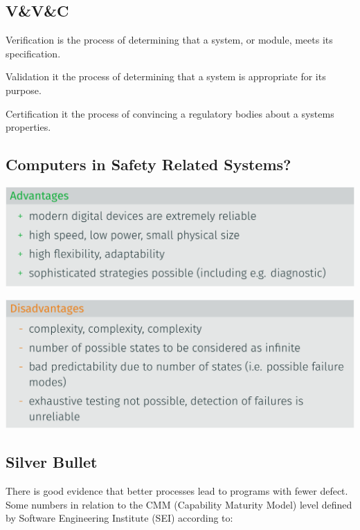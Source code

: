 \documentclass[
  10pt,
  a4paper,
]{article}
\providecommand{\tightlist}{%
  \setlength{\itemsep}{0pt}\setlength{\parskip}{0pt}}\usepackage{longtable,booktabs,array}
\begin{document}
\begin{multicols*}{2}
\subsection{V\&V\&C}\label{vvc}

\begin{description}
\tightlist
\item[Verification]
Verification is the process of determining that a system, or module,
meets its specification.
\item[Validation]
Validation it the process of determining that a system is appropriate
for its purpose.
\item[Certification]
Certification it the process of convincing a regulatory bodies about a
systems properties.
\end{description}

\subsection{Computers in Safety Related
Systems?}\label{computers-in-safety-related-systems}

\includegraphics{images/safety/image-32.png}

\includegraphics{images/safety/image-33.png}

\subsection{Silver Bullet}\label{silver-bullet}

There is good evidence that better processes lead to programs with fewer
defect. Some numbers in relation to the CMM (Capability Maturity Model)
level defined by Software Engineering Institute (SEI) according to:


\end{multicols*}
\end{document}

